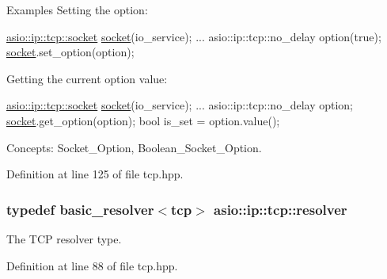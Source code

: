 \begin{DoxyParagraph}{Examples}
Setting the option\+: 
\begin{DoxyCode}
\hyperlink{classasio_1_1basic__stream__socket}{asio::ip::tcp::socket} \hyperlink{classasio_1_1ip_1_1tcp_a6f5bf95251747bb81d75784387938d6a}{socket}(io\_service); 
...
asio::ip::tcp::no\_delay option(\textcolor{keyword}{true});
\hyperlink{classasio_1_1ip_1_1tcp_a6f5bf95251747bb81d75784387938d6a}{socket}.set\_option(option);
\end{DoxyCode}

\end{DoxyParagraph}
\begin{DoxyParagraph}{}
Getting the current option value\+: 
\begin{DoxyCode}
\hyperlink{classasio_1_1basic__stream__socket}{asio::ip::tcp::socket} \hyperlink{classasio_1_1ip_1_1tcp_a6f5bf95251747bb81d75784387938d6a}{socket}(io\_service); 
...
asio::ip::tcp::no\_delay option;
\hyperlink{classasio_1_1ip_1_1tcp_a6f5bf95251747bb81d75784387938d6a}{socket}.get\_option(option);
\textcolor{keywordtype}{bool} is\_set = option.value();
\end{DoxyCode}

\end{DoxyParagraph}
\begin{DoxyParagraph}{Concepts\+:}
Socket\+\_\+\+Option, Boolean\+\_\+\+Socket\+\_\+\+Option. 
\end{DoxyParagraph}


Definition at line 125 of file tcp.\+hpp.

\hypertarget{classasio_1_1ip_1_1tcp_a5e41beb40a92f3bde7563645c2fe5f6c}{}
\subsubsection[{resolver}]{\setlength{\rightskip}{0pt plus 5cm}typedef {\bf basic\+\_\+resolver}$<${\bf tcp}$>$ {\bf asio\+::ip\+::tcp\+::resolver}}\label{classasio_1_1ip_1_1tcp_a5e41beb40a92f3bde7563645c2fe5f6c}


The T\+C\+P resolver type. 



Definition at line 88 of file tcp.\+hpp.

\hypertarget{classasio_1_1ip_1_1tcp_a6f5bf95251747bb81d75784387938d6a}{}
